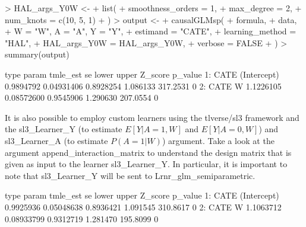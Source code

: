 \documentclass{article}
\begin{document}
\begin{Schunk}
\begin{Sinput}
> HAL_args_Y0W <-
+   list(
+     smoothness_orders = 1,
+     max_degree = 2,
+     num_knots = c(10, 5, 1)
+   )
> output <-
+   causalGLMsp(
+     formula,
+     data,
+     W = "W", A = "A", Y = "Y",
+     estimand = "CATE",
+     learning_method = "HAL",
+     HAL_args_Y0W = HAL_args_Y0W,
+     verbose = FALSE
+   )
> summary(output) 
\end{Sinput}
\begin{Soutput}
   type       param  tmle_est         se     lower    upper  Z_score p_value
1: CATE (Intercept) 0.9894792 0.04931406 0.8928254 1.086133 317.2531       0
2: CATE           W 1.1226105 0.08572600 0.9545906 1.290630 207.0554       0
\end{Soutput}
\end{Schunk}

It is also possible to employ custom learners using the tlverse/sl3 framework and the sl3\_Learner\_Y (to estimate $E[Y|A=1,W]$ and $E[Y|A=0,W]$) and sl3\_Learner\_A (to estimate $P(A=1|W)$) argument.
Take a look at the argument append\_interaction\_matrix to understand the design matrix that is given as input to the learner sl3\_Learner\_Y. In particular, it is important to note that sl3\_Learner\_Y will be sent to Lrnr\_glm\_semiparametric.

\begin{Schunk}
\begin{Soutput}
   type       param  tmle_est         se     lower    upper  Z_score p_value
1: CATE (Intercept) 0.9925936 0.05048638 0.8936421 1.091545 310.8617       0
2: CATE           W 1.1063712 0.08933799 0.9312719 1.281470 195.8099       0
\end{Soutput}
\end{Schunk}
 
\end{document}
